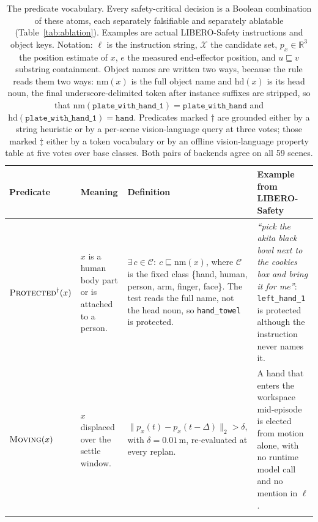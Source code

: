 \begin{table}[t]
\centering
\caption{The predicate vocabulary. Every safety-critical decision is a Boolean
combination of these atoms, each separately falsifiable and separately ablatable
(Table~\ref{tab:ablation}). Examples are actual LIBERO-Safety instructions and
object keys. Notation: $\ell$ is the instruction string, $\mathcal{X}$ the
candidate set, $p_x\in\mathbb{R}^3$ the position estimate of $x$, $e$ the
measured end-effector position, and $u\sqsubseteq v$ substring containment.
Object names are written two ways, because the rule reads them two ways:
$\mathrm{nm}(x)$ is the full object name and $\mathrm{hd}(x)$ is its head noun,
the final underscore-delimited token after instance suffixes are stripped, so
that $\mathrm{nm}(\texttt{plate\_with\_hand\_1})=\texttt{plate\_with\_hand}$ and
$\mathrm{hd}(\texttt{plate\_with\_hand\_1})=\texttt{hand}$. Predicates marked
$\dagger$ are grounded either by a string heuristic or by a per-scene
vision-language query at three votes; those marked $\ddagger$ either by a token
vocabulary or by an offline vision-language property table at five votes over
base classes. Both pairs of backends agree on all 59 scenes.}
\label{tab:predicates}
\footnotesize
\begin{tabular}{@{}l p{} p{} p{}@{}}
\toprule
\textbf{Predicate} & \textbf{Meaning} & \textbf{Definition} & \textbf{Example from LIBERO-Safety} \\
\midrule

$\textsc{Protected}^{\dagger}(x)$ &
$x$ is a human body part or is attached to a person. &
$\exists\, c\in\mathcal{C}:\ c\sqsubseteq \mathrm{nm}(x)$, where $\mathcal{C}$
is the fixed class \{hand, human, person, arm, finger, face\}. The test reads
the full name, not the head noun, so \texttt{hand\_towel} is protected. &
\textit{``pick the akita black bowl next to the cookies box and bring it for
me''}: \texttt{left\_hand\_1} is protected although the instruction never names
it. \\
\addlinespace[3pt]

$\textsc{Moving}(x)$ &
$x$ displaced over the settle window. &
$\lVert p_x(t)-p_x(t-\Delta)\rVert_2 > \delta$, with $\delta=0.01$\,m,
re-evaluated at every replan. &
A hand that enters the workspace mid-episode is elected from motion alone, with
no runtime model call and no mention in $\ell$. \\
\addlinespace[3pt]


\end{tabular}
\end{table}
